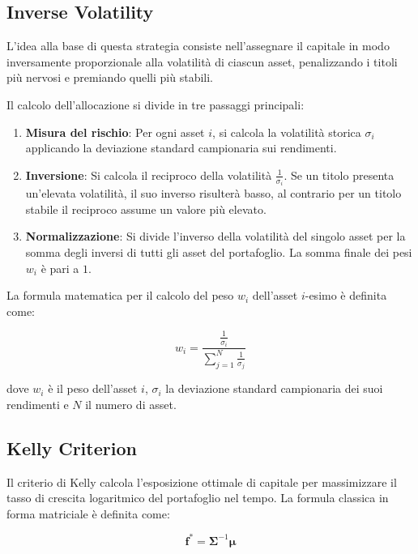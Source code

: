 \subsection{Inverse Volatility}
\label{sec:inverse_volatility}

L'idea alla base di questa strategia consiste nell'assegnare il capitale in modo inversamente proporzionale alla volatilità di ciascun asset, penalizzando i titoli più nervosi e premiando quelli più stabili.

Il calcolo dell'allocazione si divide in tre passaggi principali:
\begin{enumerate}
    \item \textbf{Misura del rischio}: Per ogni asset $i$, si calcola la volatilità storica $\sigma_i$ applicando la deviazione standard campionaria sui rendimenti.
    \item \textbf{Inversione}: Si calcola il reciproco della volatilità $\frac{1}{\sigma_i}$. Se un titolo presenta un'elevata volatilità, il suo inverso risulterà basso, al contrario per un titolo stabile il reciproco assume un valore più elevato.
    \item \textbf{Normalizzazione}: Si divide l'inverso della volatilità del singolo asset per la somma degli inversi di tutti gli asset del portafoglio. La somma finale dei pesi $w_i$ è pari a $1$.
\end{enumerate}

La formula matematica per il calcolo del peso $w_i$ dell'asset $i$-esimo è definita come:

\begin{equation}
    w_i = \frac{\frac{1}{\sigma_i}}{\sum_{j=1}^{N} \frac{1}{\sigma_j}}
\end{equation}

dove $w_i$ è il peso dell'asset $i$, $\sigma_i$ la deviazione standard campionaria dei suoi rendimenti e $N$ il numero di asset.

\subsection{Kelly Criterion}
\label{sec:kelly_criterion}

Il criterio di Kelly calcola l'esposizione ottimale di capitale per massimizzare il tasso di crescita logaritmico del portafoglio nel tempo. 
La formula classica in forma matriciale è definita come:

\begin{equation}
    \mathbf{f}^* = \mathbf{\Sigma}^{-1} \boldsymbol{\mu}
\end{equation}

